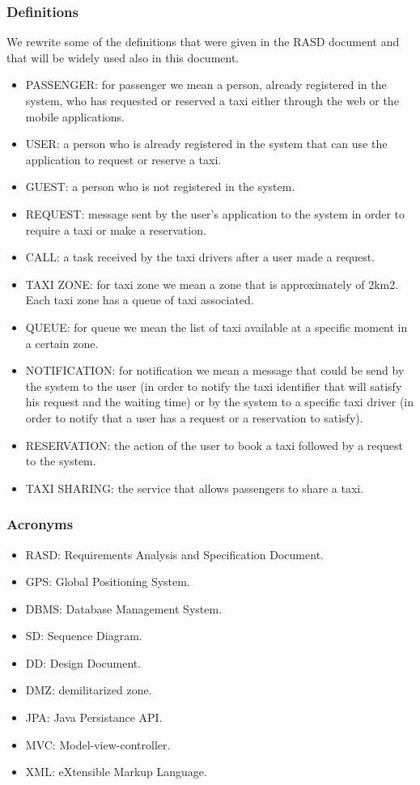 \subsubsection{Definitions}
	We rewrite some of the definitions that were given in the RASD document and that will be widely used also in this document. 
	\begin{itemize}
		\item PASSENGER: for passenger we mean a person, already registered in the system, who has requested or reserved a taxi either through the web or the mobile applications.
		\item USER: a person who is already registered in the system that can use the application to request or reserve a taxi.
		\item GUEST:  a person who is not registered in the system.
		\item REQUEST: message sent by the user's application to the system in order to require a taxi or make a reservation.
		\item CALL: a task received by the taxi drivers after a user made a request.
		\item TAXI ZONE: for taxi zone we mean a zone that is approximately of 2km2. Each taxi zone has a queue of taxi associated. 
		\item QUEUE: for queue we mean the list of taxi available at a specific moment in a certain zone.
		\item NOTIFICATION: for notification we mean a message that could be send by the system to the user (in order to notify the taxi identifier that will satisfy his request and the waiting time) or by the system to a specific taxi driver (in order to notify that a user has a request or a reservation to satisfy).
		\item RESERVATION: the action of the user to book a taxi followed by a request to the system.
		\item TAXI SHARING: the service that allows passengers to share a taxi.
	\end{itemize}

\subsubsection{Acronyms}
	\begin{itemize}
	    \item RASD: Requirements Analysis and Specification Document.
		\item GPS: Global Positioning System.
		\item DBMS: Database Management System.
		\item SD: Sequence Diagram.
		\item DD: Design Document.
		\item DMZ: demilitarized zone.
		\item JPA: Java Persistance API. 
		\item MVC: Model-view-controller.
		\item XML: eXtensible Markup Language.
	\end{itemize}